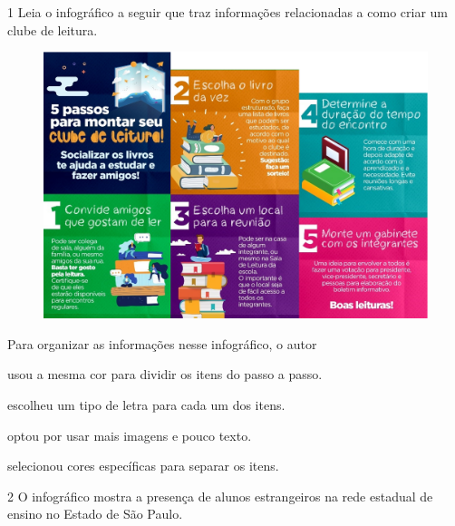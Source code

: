 \begin{conteudo}
\begin{conteudo}
\begin{conteudo}
\begin{conteudo}
\begin{conteudo}
\num{1} Leia o infográfico a seguir que traz informações relacionadas a
como criar um clube de leitura.

\begin{figure}[htpb!]
\centering
\includegraphics[width=.8\textwidth]{media/image32.png}
\end{figure}


Para organizar as informações nesse infográfico, o autor

\begin{escolha}
\item usou a mesma cor para dividir os itens do passo a passo.

\item escolheu um tipo de letra para cada um dos itens.

\item optou por usar mais imagens e pouco texto.

\item selecionou cores específicas para separar os itens.
\end{escolha}

\pagebreak
\num{2} O infográfico mostra a presença de alunos estrangeiros na rede
estadual de ensino no Estado de São Paulo.


\end{conteudo}
\end{conteudo}
\end{conteudo}
\end{conteudo}
\end{conteudo}
